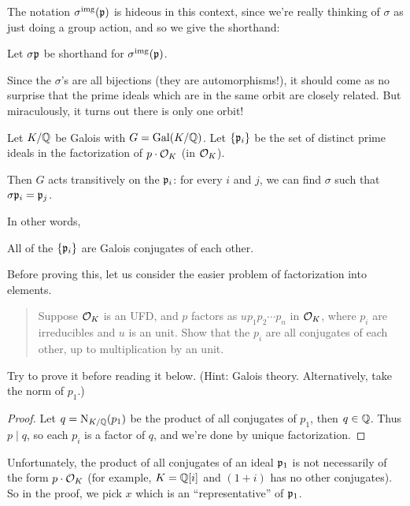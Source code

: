 The notation $\sigma^{\text{img}}(\mathfrak p)$ is hideous in this context,
since we're really thinking of $\sigma$ as just doing a group action,
and so we give the shorthand:
\begin{abuse}
	Let $\sigma\mathfrak p$ be shorthand for $\sigma^{\text{img}}(\mathfrak p)$.
\end{abuse}

Since the $\sigma$'s are all bijections (they are automorphisms!),
it should come as no surprise that the prime ideals which are in the same
orbit are closely related.
But miraculously, it turns out there is only one orbit!
\begin{theorem}
	\label{thm:galois_group_transitive}
	Let $K/\mathbb Q$ be Galois with $G = \operatorname{Gal}(K/\mathbb Q)$.
	Let $\{\mathfrak p_i\}$ be the set of distinct prime ideals in
	the factorization of $p \cdot \mathcal O_K$ (in $\mathcal O_K$).

	Then $G$ acts transitively on the $\mathfrak p_i$:
	for every $i$ and $j$, we can find $\sigma$ such that $\sigma\mathfrak p_i = \mathfrak p_j$.
\end{theorem}
In other words,
\begin{moral}
	All of the $\{\mathfrak p_i\}$ are Galois conjugates of each other.
\end{moral}

Before proving this, let us consider the easier problem
of factorization into elements.
\begin{quote}
	Suppose $\mathcal O_K$ is an UFD, and $p$ factors as $u p_1 p_2 \cdots p_n$ in
	$\mathcal O_K$, where $p_i$ are irreducibles and $u$ is an unit.
	Show that the $p_i$ are all conjugates of each other, up to
	multiplication by an unit.
\end{quote}
\begin{ques}
	Try to prove it before reading it below.
	(Hint: Galois theory. Alternatively, take the norm of $p_1$.)
\end{ques}
\begin{proof}
	Let $q=\operatorname{N}_{K/\mathbb Q}(p_1)$ be the product of all conjugates
	of $p_1$, then $q \in \mathbb Q$. Thus $p \mid q$, so each $p_i$ is a factor of
	$q$, and we're done by unique factorization.
\end{proof}

Unfortunately, the product of all conjugates of an ideal $\mathfrak p_1$ is not
necessarily of the form $p \cdot \mathcal O_K$ (for example, $K=\mathbb Q[i]$ and $(1+i)$
has no other conjugates). So in the proof, we pick $x$ which is an
``representative'' of $\mathfrak p_1$.

